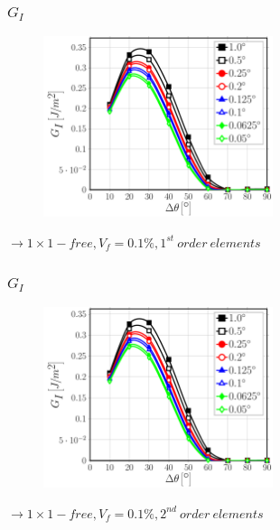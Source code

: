 \documentclass[first,firstsupp,lastsupp,last,hyperref,table]{ETHclass}
\begin{document}
\begin{frame}
\frametitle{\vspace{0.25cm}\small $G_{I}$}
\vspace{-.75cm}
\centering
\begin{figure}
\centering
\includegraphics[width=0.6\textwidth]{Vf0_1-free-1st-GI.pdf}
\end{figure}
$\rightarrow 1\times1-free, V_{f}=0.1\%, 1^{st}\ order\ elements$ 
\end{frame}

\addtocounter{framenumber}{-1}

\begin{frame}
\frametitle{\vspace{0.25cm}\small $G_{I}$}
\vspace{-.75cm}
\centering
\begin{figure}
\centering
\includegraphics[width=0.6\textwidth]{Vf0_1-free-2nd-GI.pdf}
\end{figure}
$\rightarrow 1\times1-free, V_{f}=0.1\%, 2^{nd}\ order\ elements$ 
\end{frame}

\addtocounter{framenumber}{-1}
\end{document}
